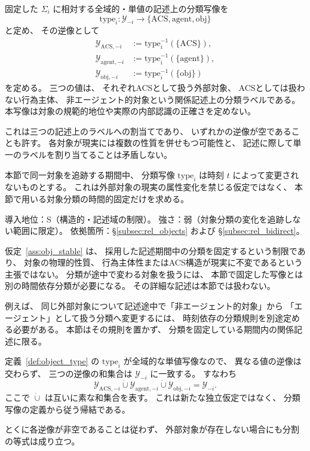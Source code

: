 \begin{definition}[外部対象の三分類]
\label{def:object_type}
固定した $\Sigma_i$ に相対する全域的・単値の記述上の分類写像を
\[
 \mathrm{type}_i:\mathcal Y_{-i}\longrightarrow
 \{\mathrm{ACS},\mathrm{agent},\mathrm{obj}\}
\]
と定め、
その逆像として
\[
\begin{aligned}
\mathcal Y_{\mathrm{ACS},-i}&:=\mathrm{type}_i^{-1}(\{\mathrm{ACS}\}),\\
\mathcal Y_{\mathrm{agent},-i}&:=\mathrm{type}_i^{-1}(\{\mathrm{agent}\}),\\
\mathcal Y_{\mathrm{obj},-i}&:=\mathrm{type}_i^{-1}(\{\mathrm{obj}\})
\end{aligned}
\]
を定める。
三つの値は、
それぞれACSとして扱う外部対象、
ACSとしては扱わない行為主体、
非エージェント的対象という関係記述上の分類ラベルである。
本写像は対象の規範的地位や実際の内部認識の正確さを定めない。

これは三つの記述上のラベルへの割当てであり、
いずれかの逆像が空であることも許す。
各対象が現実には複数の性質を併せもつ可能性と、
記述に際して単一のラベルを割り当てることは矛盾しない。
\end{definition}

\begin{assumption}[外部対象分類の固定]
\label{ass:obj_stable}
本節で同一対象を追跡する期間中、
分類写像 $\mathrm{type}_i$ は時刻 $t$ によって変更されないものとする。
これは外部対象の現実の属性変化を禁じる仮定ではなく、
本節で用いる対象分類の時間的固定だけを求める。

導入地位：S（構造的・記述域の制限）。
強さ：弱（対象分類の変化を追跡しない範囲に限定）。
依拠箇所：\S\ref{subsec:rel_objects} および \S\ref{subsec:rel_bidirect}。
\end{assumption}

\begin{remark}[分類固定仮定の意味]
\label{rem:obj_classification}
仮定~\ref{ass:obj_stable} は、
採用した記述期間中の分類を固定するという制限であり、
対象の物理的性質、
行為主体性またはACS構造が現実に不変であるという主張ではない。
分類が途中で変わる対象を扱うには、
本節で固定した写像とは別の時間依存分類が必要になる。
その詳細な記述は本節では扱わない。

例えば、
同じ外部対象について記述途中で「非エージェント的対象」から
「エージェント」として扱う分類へ変更するには、
時刻依存の分類規則を別途定める必要がある。
本節はその規則を置かず、
分類を固定している期間内の関係記述に限る。
\end{remark}

\begin{remark}
\label{rem:object_partition}
定義~\ref{def:object_type} の $\mathrm{type}_i$ が全域的な単値写像なので、
異なる値の逆像は交わらず、
三つの逆像の和集合は $\mathcal Y_{-i}$ に一致する。
すなわち
\[
\mathcal Y_{\mathrm{ACS},-i}\mathbin{\dot\cup}
\mathcal Y_{\mathrm{agent},-i}\mathbin{\dot\cup}
\mathcal Y_{\mathrm{obj},-i}=\mathcal Y_{-i}.
\]
ここで $\dot\cup$ は互いに素な和集合を表す。
これは新たな独立仮定ではなく、
分類写像の定義から従う帰結である。

とくに各逆像が非空であることは従わず、
外部対象が存在しない場合にも分割の等式は成り立つ。
\end{remark}

